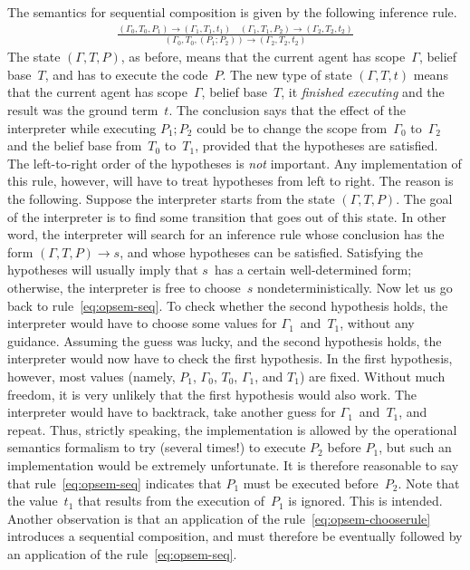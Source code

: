 \documentclass[a4paper,12pt,oneside,fleqn]{book} %
\begin{document}
{The semantics for sequential composition is given by the following
inference rule.
\begin{align}
\frac
  {(\Gamma_0,T_0,P_1)\to(\Gamma_1,T_1,t_1)
  \quad
  (\Gamma_1,T_1,P_2)\to(\Gamma_2,T_2,t_2)}
  {(\Gamma_0,T_0,(P_1;P_2))\to(\Gamma_2,T_2,t_2)}
  \label{eq:opsem-seq}
\end{align}
The state $(\Gamma,T,P)$, as before, means that the current agent has
scope~$\Gamma$, belief base~$T$, and has to execute the code~$P$. The new
type of state $(\Gamma,T,t)$ means that the current agent has
scope~$\Gamma$, belief base~$T$, it \emph{finished executing} and the
result was the ground term~$t$.  The conclusion says that the effect of the
interpreter while executing $P_1;P_2$ could be to change the scope
from~$\Gamma_0$ to~$\Gamma_2$ and the belief base from~$T_0$ to~$T_1$,
provided that the hypotheses are satisfied. The left-to-right order of the
hypotheses is \emph{not} important. Any implementation of this rule,
however, will have to treat hypotheses from left to right. The reason is
the following. Suppose the interpreter starts from the state
$(\Gamma,T,P)$. The goal of the interpreter is to find some transition that
goes out of this state. In other word, the interpreter will search for an
inference rule whose conclusion has the form $(\Gamma,T,P)\to s$, and whose
hypotheses can be satisfied.  Satisfying the hypotheses will usually imply
that $s$~has a certain well-determined form; otherwise, the interpreter is
free to choose~$s$ nondeterministically. Now let us go back to
rule~\eqref{eq:opsem-seq}. To check whether the second hypothesis holds,
the interpreter would have to choose some values for $\Gamma_1$~and~$T_1$,
without any guidance.  Assuming the guess was lucky, and the second
hypothesis holds, the interpreter would now have to check the first
hypothesis. In the first hypothesis, however, most values (namely, $P_1$,
$\Gamma_0$, $T_0$, $\Gamma_1$, and $T_1$) are fixed. Without much freedom,
it is very unlikely that the first hypothesis would also work. The
interpreter would have to backtrack, take another guess for
$\Gamma_1$~and~$T_1$, and repeat. Thus, strictly speaking, the
implementation is allowed by the operational semantics formalism to try
(several times!) to execute $P_2$ before $P_1$, but such an implementation
would be extremely unfortunate. It is therefore reasonable to say that
rule~\eqref{eq:opsem-seq} indicates that $P_1$ must be executed
before~$P_2$. Note that the value~$t_1$ that results from the execution
of~$P_1$ is ignored. This is intended. Another observation is that an
application of the rule~\eqref{eq:opsem-chooserule} introduces a sequential
composition, and must therefore be eventually followed by an application of
the rule~\eqref{eq:opsem-seq}.

}
\end{document}
